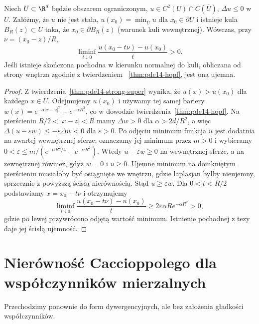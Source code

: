 \begin{wniosek}
\label{cor:pde14-hopf-super}
Niech $U\subset\R^d$ będzie obszarem ograniczonym,
$u\in C^2(U)\cap C(\overline U)$, $\Delta u\le0$ w $U$.
Załóżmy, że $u$ nie jest stała,
$u(x_0)=\min_{\overline U}u$ dla $x_0\in\partial U$
i istnieje kula $B_R(z)\subset U$ taka, że
$x_0\in\partial B_R(z)$ (warunek kuli wewnętrznej).
Wówczas, przy $\nu=(x_0-z)/R$,
\[
 \liminf_{t\downarrow0}\frac{u(x_0-t\nu)-u(x_0)}t>0.
\]
Jeśli istnieje skończona pochodna w kierunku normalnej
do kuli, obliczana od strony wnętrza zgodnie z twierdzeniem
~\ref{thm:pde14-hopf}, jest ona ujemna.
\end{wniosek}
\begin{proof}
Z twierdzenia~\ref{thm:pde14-strong-super} wynika,
że $u(x)>u(x_0)$ dla każdego $x\in U$. Odejmujemy
$u(x_0)$ i używamy tej samej bariery
$w(x)=e^{-\alpha|x-z|^2}-e^{-\alpha R^2}$,
co w dowodzie twierdzenia~\ref{thm:pde14-hopf}.
Na pierścieniu $R/2<|x-z|<R$ mamy $\Delta w>0$
dla $\alpha>2d/R^2$, a więc
$\Delta(u-\varepsilon w)\le-\varepsilon\Delta w<0$
dla $\varepsilon>0$. Po odjęciu minimum funkcja $u$
jest dodatnia na zwartej wewnętrznej sferze; oznaczamy
jej minimum przez $m>0$ i wybieramy
$0<\varepsilon\le m/(e^{-\alpha R^2/4}-e^{-\alpha R^2})$.
Wtedy $u-\varepsilon w\ge0$ na wewnętrznej sferze,
a na zewnętrznej również, gdyż $w=0$ i $u\ge0$.
Ujemne minimum na domkniętym pierścieniu musiałoby
być osiągnięte we wnętrzu, gdzie laplasjan byłby
nieujemny, sprzecznie z powyższą ścisłą nierównością.
Stąd $u\ge\varepsilon w$.
Dla $0<t<R/2$ podstawiamy $x=x_0-t\nu$ i otrzymujemy
\[
 \liminf_{t\downarrow0}
 \frac{u(x_0-t\nu)-u(x_0)}{t}
 \ge 2\varepsilon\alpha R e^{-\alpha R^2}>0,
\]
gdzie po lewej przywrócono odjętą wartość minimum.
Istnienie pochodnej z tezy daje jej ścisłą ujemność.
\end{proof}



\section{Nierówność Caccioppolego dla współczynników mierzalnych}
\label{sec:pde14-caccioppoli}
Przechodzimy ponownie do form dywergencyjnych, ale
bez założenia gładkości współczynników.

